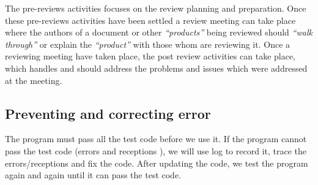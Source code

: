 The pre-reviews activities focuses on the review planning and preparation. Once these pre-reviews activities have been settled a review meeting can take place where the authors of a document or other \textit{“products”} being reviewed should \textit{“walk through”} or explain the \textit{“product”} with those whom are reviewing it. Once a reviewing meeting have taken place, the post review activities can take place, which handles and should address the problems and issues which were addressed at the meeting.


\subsection*{Preventing and correcting error}


The program must pass all the test code before we use it. If the program cannot pass the test code (errors and receptions ), we will use log to record it, trace the errors/receptions and fix the code. After updating the code, we test the program again and again until it can pass the test code.